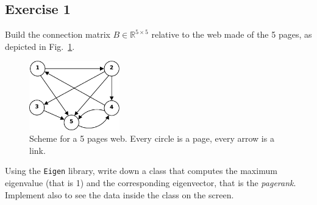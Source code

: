 \subsection*{Exercise 1}

Build the connection matrix $B\in \mathbb{R}^{5 \times 5}$ relative to the web
made of the 5 pages, as depicted in Fig.~\ref{fig:web}.
%
\begin{figure}
\centering
\includegraphics[width=0.35\textwidth]{fig/web}
\caption{Scheme for a 5 pages web. Every circle is a page, every arrow is a
link.}
\label{fig:web}
\end{figure}
%
Using the \texttt{Eigen} library, write down a class that computes the maximum
eigenvalue (that is 1) and the corresponding eigenvector, that is the
\emph{pagerank}. Implement also  to see the data inside the
class on the screen.
